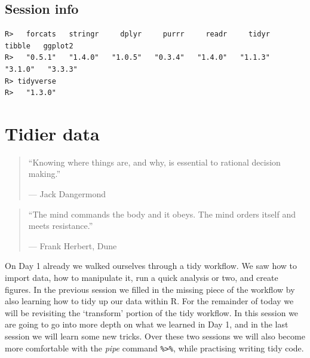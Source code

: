 \documentclass[
]{book}
\newenvironment{Shaded}{\begin{snugshade}}{\end{snugshade}}
\newcommand{\FunctionTok}[1]{\textcolor[rgb]{0.00,0.00,0.00}{#1}}
\newcommand{\NormalTok}[1]{#1}
\newcommand{\SpecialCharTok}[1]{\textcolor[rgb]{0.00,0.00,0.00}{#1}}
\newcommand{\StringTok}[1]{\textcolor[rgb]{0.31,0.60,0.02}{#1}}
\begin{document}
\hypertarget{session-info-8}{%
\section{Session info}\label{session-info-8}}

\begin{Shaded}
\end{Shaded}

\begin{verbatim}
R>   forcats   stringr     dplyr     purrr     readr     tidyr    tibble   ggplot2 
R>   "0.5.1"   "1.4.0"   "1.0.5"   "0.3.4"   "1.4.0"   "1.1.3"   "3.1.0"   "3.3.3" 
R> tidyverse 
R>   "1.3.0"
\end{verbatim}

\hypertarget{tidier}{%
\chapter{Tidier data}\label{tidier}}

\begin{quote}
``Knowing where things are, and why, is essential to rational decision making.''

--- Jack Dangermond
\end{quote}

\begin{quote}
``The mind commands the body and it obeys. The mind orders itself and meets resistance.''

--- Frank Herbert, Dune
\end{quote}

On Day 1 already we walked ourselves through a tidy workflow. We saw how to import data, how to manipulate it, run a quick analysis or two, and create figures. In the previous session we filled in the missing piece of the workflow by also learning how to tidy up our data within R. For the remainder of today we will be revisiting the `transform' portion of the tidy workflow. In this session we are going to go into more depth on what we learned in Day 1, and in the last session we will learn some new tricks. Over these two sessions we will also become more comfortable with the \emph{pipe} command \texttt{\%\textgreater{}\%}, while practising writing tidy code.
\end{document}
